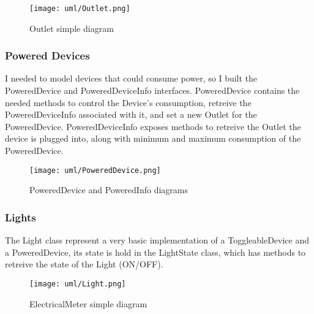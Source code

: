 \begin{figure}[H]
    \centering{}
    \texttt{[image: uml/Outlet.png]}
    \caption{Outlet simple diagram}
    \label{monticelli:uml:outlet}
\end{figure}
\subsubsection*{Powered Devices}
I needed to model devices that could consume power, so I built the PoweredDevice and PoweredDeviceInfo interfaces.
PoweredDevice contains the needed methods to control the Device's consumption, retreive the PoweredDeviceInfo associated with it, and set a new Outlet for the PoweredDevice.
PoweredDeviceInfo exposes methods to retreive the Outlet the device is plugged into, along with minimum and maximum consumption of the PoweredDevice.

\begin{figure}[H]
    \centering{}
    \texttt{[image: uml/PoweredDevice.png]}
    \caption{PoweredDevice and PoweredInfo diagrams}
    \label{monticelli:uml:poweredDevice}
\end{figure}
\subsubsection*{Lights}
The Light class represent a very basic implementation of a ToggleableDevice and a PoweredDevice, its state is hold in the LightState class, which has methods to retreive the state of the Light (ON/OFF).

\begin{figure}[H]
    \centering{}
    \texttt{[image: uml/Light.png]}
    \caption{ElectricalMeter simple diagram}
    \label{monticelli:uml:light}
\end{figure}
